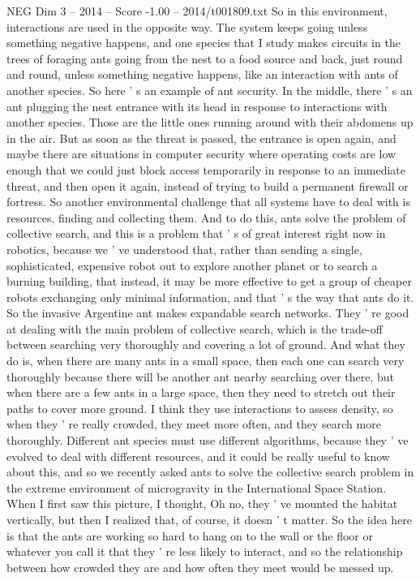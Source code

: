 \begin{textsample}{NEG Dim 3 – 2014 – Score -1.00 – 2014/t001809.txt}
So in this environment, interactions are used in the opposite way.
The system keeps going unless something negative happens, and one species that I study makes circuits in the trees of foraging ants going from the nest to a food source and back, just round and round, unless something negative happens, like an interaction with ants of another species.
So here ' s an example of ant security.
In the middle, there ' s an ant plugging the nest entrance with its head in response to interactions with another species.
Those are the little ones running around with their abdomens up in the air.
But as soon as the threat is passed, the entrance is open again, and maybe there are situations in computer security where operating costs are low enough that we could just block access temporarily in response to an immediate threat, and then open it again, instead of trying to build a permanent firewall or fortress.
So another environmental challenge that all systems have to deal with is resources, finding and collecting them.
And to do this, ants solve the problem of collective search, and this is a problem that ' s of great interest right now in robotics, because we ' ve understood that, rather than sending a single, sophisticated, expensive robot out to explore another planet or to search a burning building, that instead, it may be more effective to get a group of cheaper robots exchanging only minimal information, and that ' s the way that ants do it.
So the invasive Argentine ant makes expandable search networks.
They ' re good at dealing with the main problem of collective search, which is the trade-off between searching very thoroughly and covering a lot of ground.
And what they do is, when there are many ants in a small space, then each one can search very thoroughly because there will be another ant nearby searching over there, but when there are a few ants in a large space, then they need to stretch out their paths to cover more ground.
I think they use interactions to assess density, so when they ' re really crowded, they meet more often, and they search more thoroughly.
Different ant species must use different algorithms, because they ' ve evolved to deal with different resources, and it could be really useful to know about this, and so we recently asked ants to solve the collective search problem in the extreme environment of microgravity in the International Space Station.
When I first saw this picture, I thought, Oh no, they ' ve mounted the habitat vertically, but then I realized that, of course, it doesn ' t matter.
So the idea here is that the ants are working so hard to hang on to the wall or the floor or whatever you call it that they ' re less likely to interact, and so the relationship between how crowded they are and how often they meet would be messed up.

\end{textsample}
